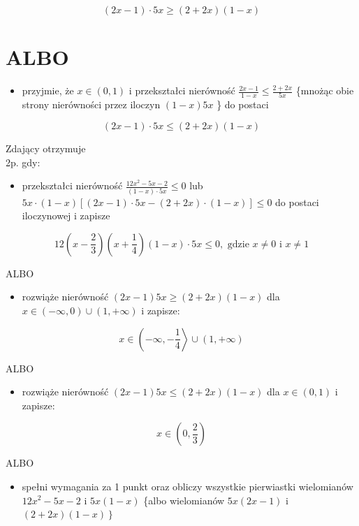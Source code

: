 \documentclass[10pt]{article}
\begin{document}
$$
(2 x-1) \cdot 5 x \geq(2+2 x)(1-x)
$$

\section*{ALBO}
\begin{itemize}
  \item przyjmie, że $x \in(0,1)$ i przekształci nierówność $\frac{2 x-1}{1-x} \leq \frac{2+2 x}{5 x}$ \{mnożąc obie strony nierówności przez iloczyn $(1-x) 5 x$ \} do postaci
\end{itemize}

$$
(2 x-1) \cdot 5 x \leq(2+2 x)(1-x)
$$

Zdający otrzymuje\\
2p. gdy:

\begin{itemize}
  \item przekształci nierówność $\frac{12 x^{2}-5 x-2}{(1-x) \cdot 5 x} \leq 0$ lub $5 x \cdot(1-x)[(2 x-1) \cdot 5 x-(2+2 x) \cdot(1-x)] \leq 0$ do postaci iloczynowej i zapisze
\end{itemize}

$$
12\left(x-\frac{2}{3}\right)\left(x+\frac{1}{4}\right)(1-x) \cdot 5 x \leq 0, \text { gdzie } x \neq 0 \text { i } x \neq 1
$$

ALBO

\begin{itemize}
  \item rozwiąże nierówność $(2 x-1) 5 x \geq(2+2 x)(1-x)$ dla $x \in(-\infty, 0) \cup(1,+\infty)$ i zapisze:
\end{itemize}

$$
x \in\left(-\infty,-\frac{1}{4}\right\rangle \cup(1,+\infty)
$$

ALBO

\begin{itemize}
  \item rozwiąże nierówność $(2 x-1) 5 x \leq(2+2 x)(1-x)$ dla $x \in(0,1)$ i zapisze:
\end{itemize}

$$
x \in\left(0, \frac{2}{3}\right)
$$

ALBO

\begin{itemize}
  \item spełni wymagania za 1 punkt oraz obliczy wszystkie pierwiastki wielomianów $12 x^{2}-5 x-2$ i $5 x(1-x)$ \{albo wielomianów $5 x(2 x-1)$ i $\left.(2+2 x)(1-x)\right\}$
\end{itemize}
\end{document}

